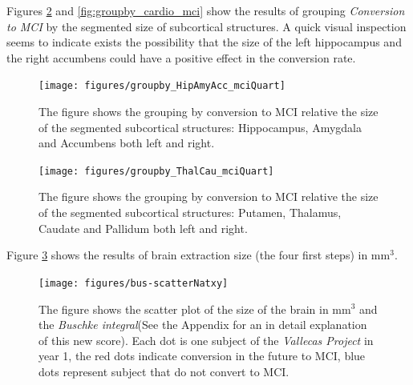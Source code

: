 \documentclass[11pt]{article}
\theoremstyle{definition}
\theoremstyle{remark}
\begin{document}
Figures \ref{fig:groupby_HipAmyAcc_mciQuart} and \ref{fig:groupby_cardio_mci} show the results of grouping \emph{Conversion to MCI} by the segmented size of subcortical structures. 
A quick visual inspection seems to indicate exists the possibility that the size of the left hippocampus and the right accumbens could have a positive effect in the conversion rate.

\begin{figure}[H]
        \centering
        \texttt{[image: figures/groupby\_HipAmyAcc\_mciQuart]}
        \caption{The figure shows the grouping by conversion to MCI relative the size of the segmented subcortical structures: Hippocampus, Amygdala and Accumbens both left and right.}
        \label{fig:groupby_HipAmyAcc_mciQuart}
\end{figure}

\begin{figure}[H]
        \centering
        \texttt{[image: figures/groupby\_ThalCau\_mciQuart]}
        \caption{The figure shows the grouping by conversion to MCI relative the size of the segmented subcortical structures: Putamen, Thalamus, Caudate and Pallidum both left and right.}
        \label{fig:groupby_HipAmyAcc_mciQuart}
\end{figure}



Figure \ref{fig:scatternative} shows the results of brain extraction size (the four first steps) in mm${^3}$. 
\begin{figure}[H]
        \centering
        \texttt{[image: figures/bus-scatterNatxy]}
        \caption{The figure shows the scatter plot of the size of the brain in mm${^3}$ and the \emph{Buschke integral}(See the Appendix for an in detail explanation of this new score). Each dot is one subject of the \emph{Vallecas Project} in year 1, the red dots indicate conversion in the future to MCI, blue dots represent subject that do not convert to MCI.} 
        \label{fig:scatternative}
\end{figure}
\end{document}
